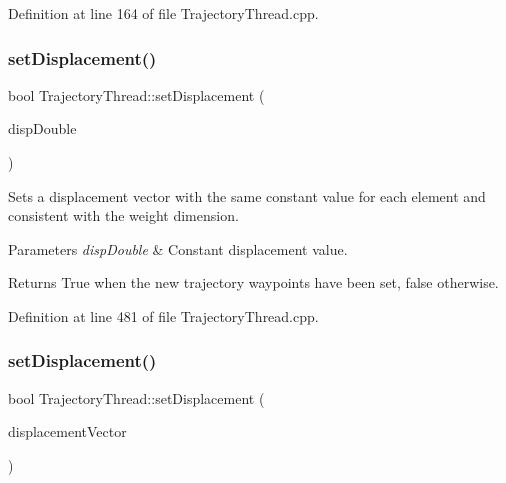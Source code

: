 Definition at line 164 of file Trajectory\+Thread.\+cpp.

\hypertarget{classocra__recipes_1_1TrajectoryThread_a8cff41b23344e18cd795354ba893b3e2}{}\label{classocra__recipes_1_1TrajectoryThread_a8cff41b23344e18cd795354ba893b3e2} 
\subsubsection{\texorpdfstring{set\+Displacement()}{setDisplacement()}\hspace{0.1cm}{\footnotesize\ttfamily [1/2]}}
{\footnotesize\ttfamily bool Trajectory\+Thread\+::set\+Displacement (\begin{DoxyParamCaption}\item[{double}]{disp\+Double }\end{DoxyParamCaption})}

Sets a displacement vector with the same constant value for each element and consistent with the weight dimension.


\begin{DoxyParams}{Parameters}
{\em disp\+Double} & Constant displacement value.\\
\hline
\end{DoxyParams}
\begin{DoxyReturn}{Returns}
True when the new trajectory waypoints have been set, false otherwise. 
\end{DoxyReturn}


Definition at line 481 of file Trajectory\+Thread.\+cpp.

\hypertarget{classocra__recipes_1_1TrajectoryThread_ab068cd5ad8d3b000c0af32311c113141}{}\label{classocra__recipes_1_1TrajectoryThread_ab068cd5ad8d3b000c0af32311c113141} 
\subsubsection{\texorpdfstring{set\+Displacement()}{setDisplacement()}\hspace{0.1cm}{\footnotesize\ttfamily [2/2]}}
{\footnotesize\ttfamily bool Trajectory\+Thread\+::set\+Displacement (\begin{DoxyParamCaption}\item[{const Eigen\+::\+Vector\+Xd \&}]{displacement\+Vector }\end{DoxyParamCaption})}

